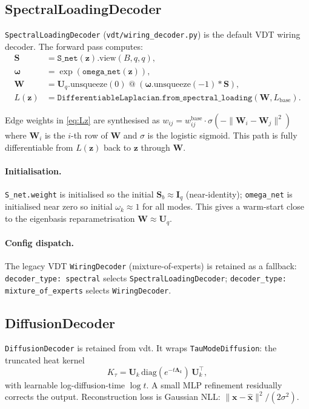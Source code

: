 \documentclass[11pt,a4paper]{article}
\newcommand{\diag}{\mathrm{diag}}
\newcommand{\bLambda}{\bm{\Lambda}}
\newcommand{\bU}{\bm{U}}
\newcommand{\bS}{\bm{S}}
\newcommand{\bW}{\bm{W}}
\newcommand{\bz}{\bm{z}}
\newcommand{\bomega}{\bm{\omega}}
\newcommand{\bx}{\bm{x}}
\begin{document}
\subsection{SpectralLoadingDecoder}
\label{sec:decoder}

\texttt{SpectralLoadingDecoder} (\texttt{vdt/wiring\_decoder.py}) is the
default VDT wiring decoder.  The forward pass computes:
\begin{align}
  \bS &= \texttt{S\_net}(\bz).\text{view}(B,q,q), \label{eq:S_net}\\
  \bomega &= \exp(\texttt{omega\_net}(\bz)), \label{eq:omega_net}\\
  \bW &= \bU_q.\text{unsqueeze}(0)
        \;\texttt{@}\;(\bomega.\text{unsqueeze}(-1)\ast\bS),
        \label{eq:W}\\
  L(\bz) &= \texttt{DifferentiableLaplacian.from\_spectral\_loading}(\bW, L_{\mathrm{base}}).
           \label{eq:Lz}
\end{align}

Edge weights in \eqref{eq:Lz} are synthesised as
$w_{ij} = w_{ij}^{\mathrm{base}}\cdot\sigma(-\|\bW_i-\bW_j\|^2)$ where
$\bW_i$ is the $i$-th row of $\bW$ and $\sigma$ is the logistic sigmoid.
This path is fully differentiable from $L(\bz)$ back to $\bz$ through $\bW$.

\paragraph{Initialisation.}
\texttt{S\_net.weight} is initialised so the initial $\bS_b\approx\bm{I}_q$
(near-identity); \texttt{omega\_net} is initialised near zero so initial
$\omega_k\approx 1$ for all modes.  This gives a warm-start close to the
eigenbasis reparametrisation $\bW\approx\bU_q$.

\paragraph{Config dispatch.}
The legacy VDT \texttt{WiringDecoder} (mixture-of-experts) is retained as a
fallback: \texttt{decoder\_type: spectral} selects
\texttt{SpectralLoadingDecoder}; \texttt{decoder\_type: mixture\_of\_experts}
selects \texttt{WiringDecoder}.

\subsection{DiffusionDecoder}

\texttt{DiffusionDecoder} is retained from vdt.  It wraps
\texttt{TauModeDiffusion}: the truncated heat kernel
\begin{equation}
  K_\tau = \bU_k\,\diag(e^{-t\bLambda_k})\,\bU_k^\top,
  \label{eq:heat_kernel}
\end{equation}
with learnable log-diffusion-time $\log t$.  A small MLP refinement
residually corrects the output.  Reconstruction loss is Gaussian NLL:
$\|\bx-\hat{\bx}\|^2/(2\sigma^2)$.
\end{document}
